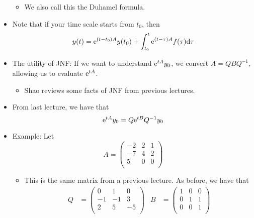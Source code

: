 \documentclass[../notes.tex]{subfiles}
\begin{document}
\begin{itemize}
    \begin{itemize}
        \item We also call this the Duhamel formula.
    \end{itemize}
    \item Note that if your time scale starts from $t_0$, then
    \begin{equation*}
        y(t) = \e[(t-t_0)A]y(t_0)+\int_{t_0}^t\e[(t-\tau)A]f(\tau)\dd\tau
    \end{equation*}
    \item The utility of JNF: If we want to understand $\e[tA]y_0$, we convert $A=QBQ^{-1}$, allowing us to evaluate $\e[tA]$.
    \begin{itemize}
        \item Shao reviews some facts of JNF from previous lectures.
    \end{itemize}
    \item From last lecture, we have that
    \begin{equation*}
        \e[tA]y_0 = Q\e[tB]Q^{-1}y_0
    \end{equation*}
    \item Example: Let
    \begin{equation*}
        A =
        \begin{pmatrix}
            -2 & 2 & 1\\
            -7 & 4 & 2\\
            5 & 0 & 0\\
        \end{pmatrix}
    \end{equation*}
    \begin{itemize}
        \item This is the same matrix from a previous lecture. As before, we have that
        \begin{align*}
            Q &=
            \begin{pmatrix}
                0 & 1 & 0\\
                -1 & -1 & 3\\
                2 & 5 & -5\\
            \end{pmatrix}&
            B &=
            \begin{pmatrix}
                1 & 0 & 0\\
                0 & 1 & 1\\
                0 & 0 & 1\\
            \end{pmatrix}

\end{align*}
\end{itemize}
\end{itemize}
\end{document}
